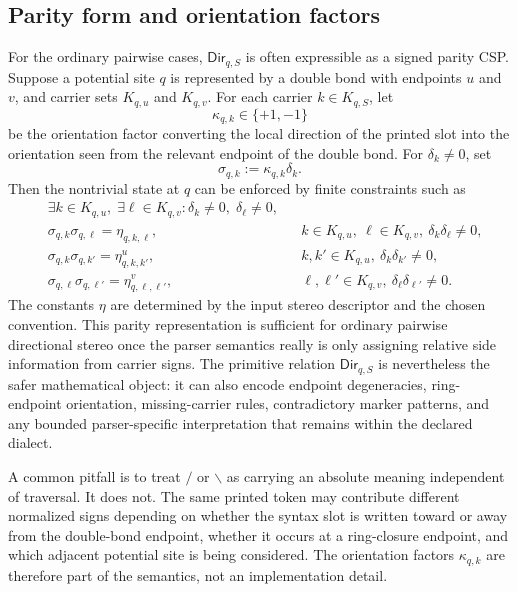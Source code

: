 \documentclass[10pt,a4paper]{article}
\newcommand{\Dir}{\mathsf{Dir}}
\theoremstyle{definition}
\theoremstyle{remark}
\begin{document}
	\subsection{Parity form and orientation factors}
	\label{s:parity}

	For the ordinary pairwise cases, \(\Dir_{q,S}\) is often expressible as a signed
	parity CSP.  Suppose a potential site \(q\) is represented by a double bond with
	endpoints \(u\) and \(v\), and carrier sets \(K_{q,u}\) and \(K_{q,v}\).  For
	each carrier \(k\in K_{q,S}\), let
	\[
	\kappa_{q,k}\in\{+1,-1\}
	\]
	be the orientation factor converting the local direction of the printed slot
	into the orientation seen from the relevant endpoint of the double bond.  For
	\(\delta_k\ne0\), set
	\[
	\sigma_{q,k}:=\kappa_{q,k}\delta_k .
	\]
	Then the nontrivial state at \(q\) can be enforced by finite constraints such as
	\begin{align*}
		&\exists k\in K_{q,u},\;\exists \ell\in K_{q,v}:
		\delta_k\ne0,
		\;\delta_\ell\ne0,\\
		&\sigma_{q,k}\sigma_{q,\ell}=\eta_{q,k,\ell},
		&&k\in K_{q,u},\ \ell\in K_{q,v},\
		\delta_k\delta_\ell\ne0,\\
		&\sigma_{q,k}\sigma_{q,k'}=\eta^u_{q,k,k'},
		&&k,k'\in K_{q,u},\
		\delta_k\delta_{k'}\ne0,\\
		&\sigma_{q,\ell}\sigma_{q,\ell'}=\eta^v_{q,\ell,\ell'},
		&&\ell,\ell'\in K_{q,v},\
		\delta_\ell\delta_{\ell'}\ne0 .
	\end{align*}
	The constants \(\eta\) are determined by the input stereo descriptor and the
	chosen convention.  This parity representation is sufficient for ordinary
	pairwise directional stereo once the parser semantics really is only assigning
	relative side information from carrier signs.  The primitive relation
	\(\Dir_{q,S}\) is nevertheless the safer mathematical object: it can also encode
	endpoint degeneracies, ring-endpoint orientation, missing-carrier rules,
	contradictory marker patterns, and any bounded parser-specific interpretation
	that remains within the declared dialect.

	A common pitfall is to treat \(\mathtt{/}\) or \(\backslash\) as carrying an absolute
	meaning independent of traversal.  It does not.  The same printed token may
	contribute different normalized signs depending on whether the syntax slot is
	written toward or away from the double-bond endpoint, whether it occurs at a
	ring-closure endpoint, and which adjacent potential site is being considered.
	The orientation factors \(\kappa_{q,k}\) are therefore part of the semantics, not
	an implementation detail.
\end{document}

